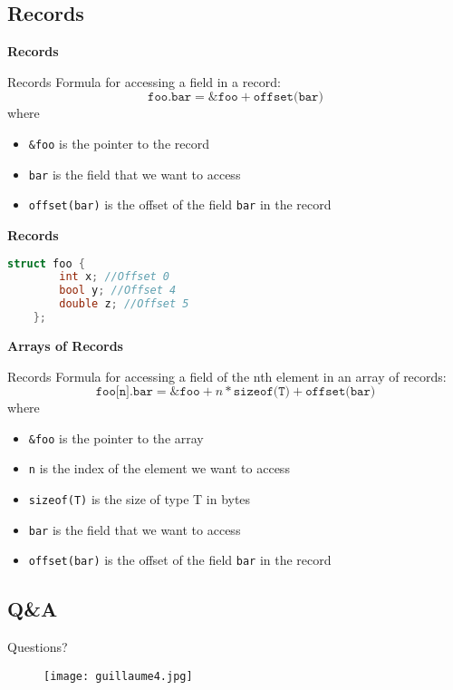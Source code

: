 \subsection*{Records}
\begin{frame}{\textbf{Records}}
    \begin{block}{Records}
        Formula for accessing a field in a record:
        \begin{equation*}
            \texttt{foo.bar} = \texttt{\&foo} + \texttt{offset(bar)}
        \end{equation*}
        where 
        \begin{itemize}
            \item \texttt{\&foo} is the pointer to the record
            \item \texttt{bar} is the field that we want to access
            \item \texttt{offset(bar)} is the offset of the field \texttt{bar} in the record
        \end{itemize}
    \end{block}
\end{frame}

\begin{frame}[fragile]{\textbf{Records}}
    \begin{example}
        \begin{lstlisting}[language=c]
    struct foo {
        int x; //Offset 0
        bool y; //Offset 4
        double z; //Offset 5
    };
        \end{lstlisting}
    \end{example}
\end{frame}

\begin{frame}{\textbf{Arrays of Records}}
    \begin{block}{Records}
        Formula for accessing a field of the nth element in an array of records:
        \begin{equation}
            \texttt{foo[n].bar} = \texttt{\&foo} + n * \texttt{sizeof(T)} + \texttt{offset(bar)}
        \end{equation}
        where 
        \begin{itemize}
            \item \texttt{\&foo} is the pointer to the array
            \item \texttt{n} is the index of the element we want to access
            \item \texttt{sizeof(T)} is the size of type T in bytes
            \item \texttt{bar} is the field that we want to access
            \item \texttt{offset(bar)} is the offset of the field \texttt{bar} in the record
        \end{itemize}
    \end{block}
\end{frame}

\subsection*{Q\&A}
\begin{frame}{Questions?}
    \begin{figure}
        \centering
        \texttt{[image: guillaume4.jpg]}
    \end{figure}
\end{frame}